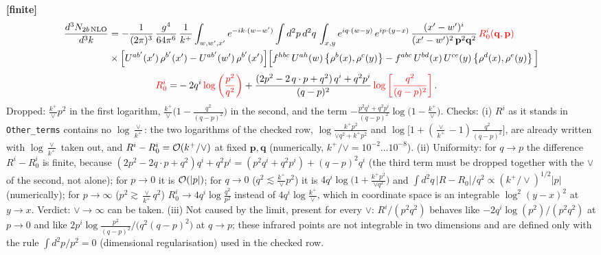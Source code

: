 \documentclass[9pt]{article}
\numberwithin{equation}{section}
\begin{document}
\noindent\textbf{[finite]}
\begin{align}
\frac{d^{3}N_{2b\,\rm NLO}}{d^{3}k} & = -\frac{1}{(2\pi)^{3}}\,\frac{g^{4}}{64\pi^{6}}\,\frac{1}{k^{+}}\int_{w,w',x'} e^{-ik\cdot(w-w')}
\int d^{2}p\,d^{2}q\,\int_{x,y} e^{iq\cdot(w-y)}\,e^{ip\cdot(y-x)}\,\frac{(x'-w')^{i}}{(x'-w')^{2}\,\mathbf{p}^{2}\mathbf{q}^{2}}\,{\color{red}R^{i}_{0}(\mathbf{q},\mathbf{p})}\notag\\
&\times\Big[U^{ab'}(x')\,\rho^{b'}(x')-U^{ab'}(w')\,\rho^{b'}(x')\Big]
\Big[f^{hbc}\,U^{ah}(w)\left\{\rho^{b}(x),\rho^{c}(y)\right\}-f^{abc}\,U^{bd}(x)\,U^{ce}(y)\left\{\rho^{d}(x),\rho^{e}(y)\right\}\Big]
\end{align}
\begin{align}
{\color{red}R^{i}_{0}} =& -2q^{i}\,{\color{red}\log\left(\frac{p^{2}}{q^{2}}\right)}
+\frac{(2p^{2}-2\,q\cdot p+q^{2})\,q^{i}+q^{2}p^{i}}{(q-p)^{2}}\,
{\color{red}\log\left[\frac{q^{2}}{(q-p)^{2}}\right]}\,.
\end{align}
{\color{orange}Dropped: $\frac{k^{+}}{\vee}p^{2}$ in the first logarithm, $\frac{k^{+}}{\vee}\big(1-\frac{q^{2}}{(q-p)^{2}}\big)$ in the second, and the term $-\frac{p^{2}q^{i}+q^{2}p^{i}}{(q-p)^{2}}\log\big(1-\frac{k^{+}}{\vee}\big)$.} Checks: (i) $R^{i}$ as it stands in \texttt{Other\_terms} contains no $\log\frac{\vee}{k^{+}}$: the two logarithms of the checked row, $\log\frac{k^{+}p^{2}}{\vee q^{2}+k^{+}p^{2}}$ and $\log\big[1+(\frac{\vee}{k^{+}}-1)\frac{q^{2}}{(q-p)^{2}}\big]$, are already written with $\log\frac{\vee}{k^{+}}$ taken out, and $R^{i}-R^{i}_{0}={\cal O}(k^{+}/\vee)$ at fixed $\mathbf{p},\mathbf{q}$ (numerically, $k^{+}/\vee=10^{-2}\dots10^{-8}$). (ii) Uniformity: for $q\to p$ the difference $R^{i}-R^{i}_{0}$ is finite, because $(2p^{2}-2q\cdot p+q^{2})q^{i}+q^{2}p^{i}=(p^{2}q^{i}+q^{2}p^{i})+(q-p)^{2}q^{i}$ (the third term must be dropped together with the $\vee$ of the second, not alone); for $p\to0$ it is ${\cal O}(|p|)$; for $q\to0$ ($q^{2}\lesssim\frac{k^{+}}{\vee}p^{2}$) it is $4q^{i}\log\big(1+\frac{k^{+}p^{2}}{\vee q^{2}}\big)$ and $\int d^{2}q\,|R-R_{0}|/q^{2}\propto(k^{+}/\vee)^{1/2}|p|$ (numerically); for $p\to\infty$ ($p^{2}\gtrsim\frac{\vee}{k^{+}}q^{2}$) $R^{i}_{0}\to4q^{i}\log\frac{q^{2}}{p^{2}}$ instead of $4q^{i}\log\frac{k^{+}}{\vee}$, which in coordinate space is an integrable $\log^{2}(y-x)^{2}$ at $y\to x$. Verdict: $\vee\to\infty$ can be taken. (iii) Not caused by the limit, present for every $\vee$: $R^{i}/(p^{2}q^{2})$ behaves like $-2q^{i}\log(p^{2})/(p^{2}q^{2})$ at $p\to0$ and like $2p^{i}\log\frac{p^{2}}{(q-p)^{2}}/\big(q^{2}(q-p)^{2}\big)$ at $q\to p$; these infrared points are not integrable in two dimensions and are defined only with the rule $\int d^{2}p/p^{2}=0$ (dimensional regularisation) used in the checked row.
\end{document}
